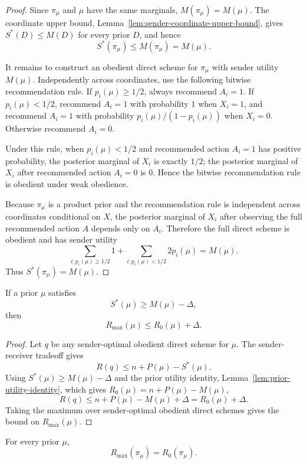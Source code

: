 \documentclass[format=acmsmall, review=false]{acmart}
\begin{document}
\begin{proof}
Since $\pi_\mu$ and $\mu$ have the same marginals, $M(\pi_\mu)=M(\mu)$.
The coordinate upper bound, Lemma~\ref{lem:sender-coordinate-upper-bound},
gives $S^*(D)\leq M(D)$ for every prior $D$, and hence
\[
S^*(\pi_\mu)\leq M(\pi_\mu)=M(\mu).
\]

It remains to construct an obedient direct scheme for $\pi_\mu$ with sender
utility $M(\mu)$. Independently across coordinates, use the following bitwise
recommendation rule. If $p_i(\mu)\geq 1/2$, always recommend $A_i=1$. If
$p_i(\mu)<1/2$, recommend $A_i=1$ with probability $1$ when $X_i=1$, and
recommend $A_i=1$ with probability $p_i(\mu)/(1-p_i(\mu))$ when $X_i=0$.
Otherwise recommend $A_i=0$.

Under this rule, when $p_i(\mu)<1/2$ and recommended action $A_i=1$ has
positive probability, the posterior marginal of $X_i$ is exactly $1/2$; the
posterior marginal of $X_i$ after recommended action $A_i=0$ is $0$. Hence the
bitwise recommendation rule is obedient under weak obedience.

Because $\pi_\mu$ is a product prior and the recommendation rule is independent
across coordinates conditional on $X$, the posterior marginal of $X_i$ after
observing the full recommended action $A$ depends only on $A_i$. Therefore the
full direct scheme is obedient and has sender utility
\[
\sum_{i:p_i(\mu)\geq 1/2}1+\sum_{i:p_i(\mu)<1/2}2p_i(\mu)
=M(\mu).
\]
Thus $S^*(\pi_\mu)=M(\mu)$.
\end{proof}

\begin{lemma}
\label{lem:sender-value-deficit}
If a prior $\mu$ satisfies
\[
S^*(\mu)\geq M(\mu)-\Delta,
\]
then
\[
R_{\max}(\mu)\leq R_0(\mu)+\Delta.
\]
\end{lemma}

\begin{proof}
Let $q$ be any sender-optimal obedient direct scheme for $\mu$. The
sender-receiver tradeoff gives
\[
R(q)\leq n+P(\mu)-S^*(\mu).
\]
Using $S^*(\mu)\geq M(\mu)-\Delta$ and the prior utility identity,
Lemma~\ref{lem:prior-utility-identity}, which gives
$R_0(\mu)=n+P(\mu)-M(\mu)$,
\[
R(q)\leq n+P(\mu)-M(\mu)+\Delta=R_0(\mu)+\Delta.
\]
Taking the maximum over sender-optimal obedient direct schemes gives the bound
on $R_{\max}(\mu)$.
\end{proof}

\begin{corollary}
\label{cor:product-no-receiver-gain}
For every prior $\mu$,
\[
R_{\max}(\pi_\mu)=R_0(\pi_\mu).
\]
\end{corollary}
\end{document}
